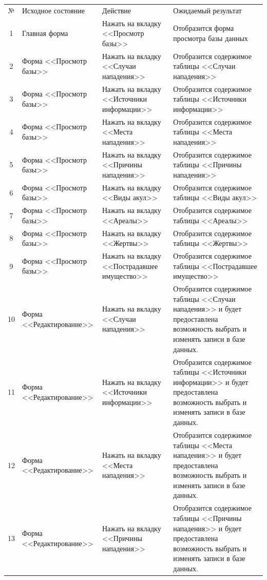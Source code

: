 \documentclass[russian,utf8,simple,emptystyle]{eskdtext}
\begin{document}
\small
\begin{longtable}{c | L{3cm} | L{6cm} | L{6cm} }
	№ & Исходное состояние & Действие & Ожидаемый результат \\
	1 & Главная форма & Нажать на вкладку <<Просмотр базы>> & Отобразится форма просмотра базы данных \\
	2 & Форма <<Просмотр базы>> & Нажать на вкладку <<Случаи нападения>> & Отобразится содержимое таблицы <<Случаи нападения>> \\
	3 & Форма <<Просмотр базы>> & Нажать на вкладку <<Источники информации>> & Отобразится содержимое таблицы <<Источники информации>> \\
	4 & Форма <<Просмотр базы>> & Нажать на вкладку <<Места нападения>> & Отобразится содержимое таблицы <<Места нападения>> \\
	5 & Форма <<Просмотр базы>> & Нажать на вкладку <<Причины нападения>> & Отобразится содержимое таблицы <<Причины нападения>> \\
	6 & Форма <<Просмотр базы>> & Нажать на вкладку <<Виды акул>> & Отобразится содержимое таблицы <<Виды акул>> \\
	7 & Форма <<Просмотр базы>> & Нажать на вкладку <<Ареалы>> & Отобразится содержимое таблицы <<Ареалы>> \\
	8 & Форма <<Просмотр базы>> & Нажать на вкладку <<Жертвы>> & Отобразится содержимое таблицы <<Жертвы>> \\
	9 & Форма <<Просмотр базы>> & Нажать на вкладку <<Пострадавшее имущество>> & Отобразится содержимое таблицы <<Пострадавшее имущество>> \\
	10 & Форма <<Редактирование>> & Нажать на вкладку <<Случаи нападения>> & Отобразится содержимое таблицы <<Случаи нападения>> и будет предоставлена возможность выбрать и изменять записи в базе данных. \\
	11 & Форма <<Редактирование>> & Нажать на вкладку <<Источники информации>> & Отобразится содержимое таблицы <<Источники информации>> и будет предоставлена возможность выбрать и изменять записи в базе данных. \\
	12 & Форма <<Редактирование>> & Нажать на вкладку <<Места нападения>> & Отобразится содержимое таблицы <<Места нападения>> и будет предоставлена возможность выбрать и изменять записи в базе данных. \\
	13 & Форма <<Редактирование>> & Нажать на вкладку <<Причины нападения>> & Отобразится содержимое таблицы <<Причины нападения>> и будет предоставлена возможность выбрать и изменять записи в базе данных. \\

\end{longtable}
\end{document}
